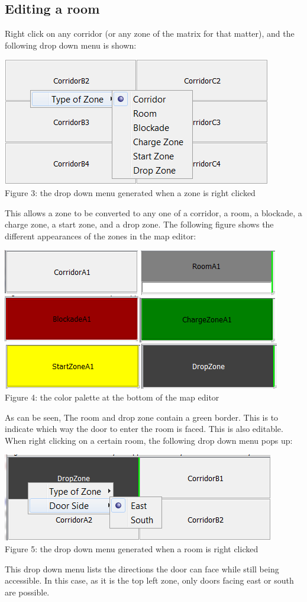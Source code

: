 \subsection{Editing a room}
Right click on any corridor (or any zone of the matrix for that matter), and the following drop down menu is shown:
\begin{center}
	\centering
	\includegraphics[scale=0.55]{DropDownMenuRoom.png}\\
	Figure 3: the drop down menu generated when a zone is right clicked
\end{center}
This allows a zone to be converted to any one of a corridor, a room, a blockade, a charge zone, a start zone, and a drop zone. The following figure shows the different appearances of the zones in the map editor:
\begin{center}
	\centering
	\includegraphics{DifferentRooms.png}\\
	Figure 4: the color palette at the bottom of the map editor
\end{center}
As can be seen, The room and drop zone contain a green border. This is to indicate which way the door to enter the room is faced. This is also editable. When right clicking on a certain room, the following drop down menu pops up:
\begin{center}
	\centering
	\includegraphics{DropDownMenuRoom2.png}\\
	Figure 5: the drop down menu generated when a room is right clicked
\end{center}
This drop down menu lists the directions the door can face while still being accessible. In this case, as it is the top left zone, only doors facing east or south are possible.
